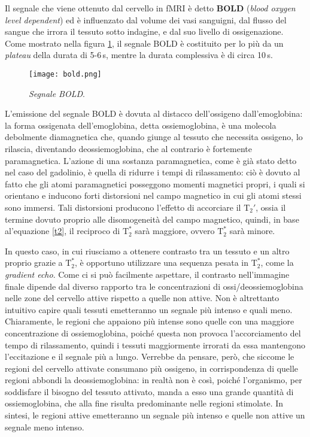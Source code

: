 \documentclass{report}
\newcommand{\figref}[1]{figura \ref{#1}}
\renewcommand{\eqref}[1]{equazione \ref{#1}}
\numberwithin{equation}{section}
\numberwithin{figure}{section}
\begin{document}
Il segnale che viene ottenuto dal cervello in fMRI è detto \textbf{BOLD} (\textit{blood oxygen level dependent}) ed è influenzato dal volume dei vasi sanguigni, dal flusso del sangue che irrora il tessuto sotto indagine, e dal suo livello di ossigenazione. Come mostrato nella \figref{fig:bold}, il segnale BOLD è costituito per lo più da un \textit{plateau} della durata di 5-6\,s, mentre la durata complessiva è di circa 10\,s.

\begin{figure}[htp]
\centering
\texttt{[image: bold.png]}
\caption{\label{fig:bold} \textit{Segnale BOLD}.}
\end{figure}

\noindent L'emissione del segnale BOLD è dovuta al distacco dell'ossigeno dall'emoglobina: la forma ossigenata dell'emoglobina, detta ossiemoglobina, è una molecola debolmente diamagnetica che, quando giunge al tessuto che necessita ossigeno, lo rilascia, diventando deossiemoglobina, che al contrario è fortemente paramagnetica. L'azione di una sostanza paramagnetica, come è già stato detto nel caso del gadolinio, è quella di ridurre i tempi di rilassamento: ciò è dovuto al fatto che gli atomi paramagnetici posseggono momenti magnetici propri, i quali si orientano e inducono forti distorsioni nel campo magnetico in cui gli atomi stessi sono immersi. Tali distorsioni producono l'effetto di accorciare il $\mathrm{T}_2'$, ossia il termine dovuto proprio alle disomogeneità del campo magnetico, quindi, in base al'\eqref{t2}, il reciproco di $\mathrm{T}_2^*$ sarà maggiore, ovvero $\mathrm{T}_2^*$ sarà minore.

In questo caso, in cui riusciamo a ottenere contrasto tra un tessuto e un altro proprio grazie a $\mathrm{T}_2^*$, è opportuno utilizzare una sequenza pesata in $\mathrm{T}_2^*$, come la \textit{gradient echo}. Come ci si può facilmente aspettare, il contrasto nell'immagine finale dipende dal diverso rapporto tra le concentrazioni di ossi/deossiemoglobina nelle zone del cervello attive rispetto a quelle non attive. Non è altrettanto intuitivo capire quali tessuti emetteranno un segnale più intenso e quali meno. Chiaramente, le regioni che appaiono più intense sono quelle con una maggiore concentrazione di ossiemoglobina, poiché questa non provoca l'accorciamento del tempo di rilassamento, quindi i tessuti maggiormente irrorati da essa mantengono l'eccitazione e il segnale più a lungo. Verrebbe da pensare, però, che siccome le regioni del cervello attivate consumano più ossigeno, in corrispondenza di quelle regioni abbondi la deossiemoglobina: in realtà non è così, poiché l'organismo, per soddisfare il bisogno del tessuto attivato, manda a esso una grande quantità di ossiemoglobina, che alla fine risulta predominante nelle regioni stimolate. In sintesi, le regioni attive emetteranno un segnale più intenso e quelle non attive un segnale meno intenso.
\end{document}

